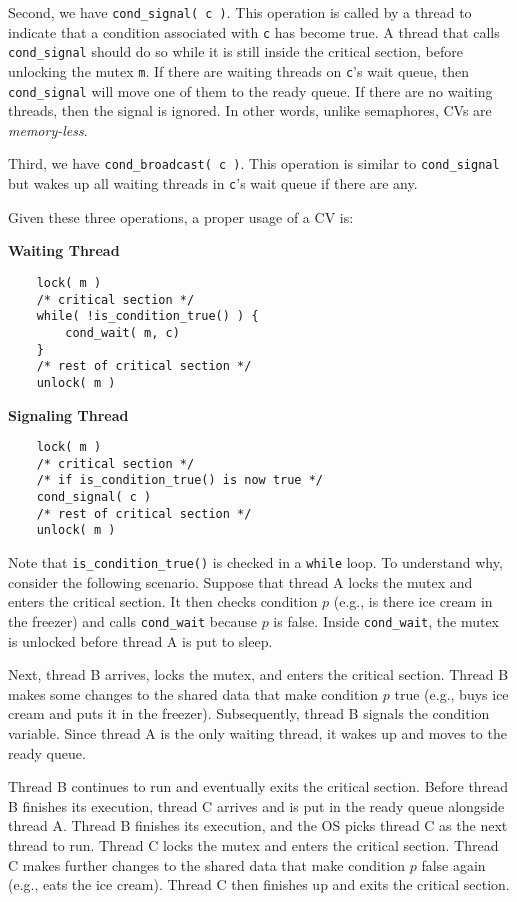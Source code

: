Second, we have \texttt{cond\_signal( c )}.
This operation is called by a thread to indicate that a condition associated with \texttt{c} has become true.
A thread that calls \texttt{cond\_signal} should do so while it is still inside the critical section, before unlocking the mutex \texttt{m}.
If there are waiting threads on \texttt{c}'s wait queue, then \texttt{cond\_signal} will move one of them to the ready queue.
If there are no waiting threads, then the signal is ignored.
In other words, unlike semaphores, CVs are \emph{memory-less}.

Third, we have \texttt{cond\_broadcast( c )}.
This operation is similar to \texttt{cond\_signal} but wakes up all waiting threads in \texttt{c}'s wait queue if there are any.

Given these three operations, a proper usage of a CV is:

\begin{multicols}{2}
	\textbf{Waiting Thread}\vspace{-2em}
	\begin{verbatim}
	lock( m )
	/* critical section */
	while( !is_condition_true() ) {
	    cond_wait( m, c)
	}
	/* rest of critical section */
	unlock( m )
	\end{verbatim}
	\columnbreak
	\textbf{Signaling Thread}
	\begin{verbatim}
	lock( m )
	/* critical section */
	/* if is_condition_true() is now true */
	cond_signal( c )
	/* rest of critical section */
	unlock( m )
  \end{verbatim}
\end{multicols}

Note that \texttt{is\_condition\_true()} is checked in a \texttt{while} loop.
To understand why, consider the following scenario.
Suppose that thread A locks the mutex and enters the critical section.
It then checks condition $p$ (e.g., is there ice cream in the freezer) and calls \texttt{cond\_wait} because $p$ is false.
Inside \texttt{cond\_wait}, the mutex is unlocked before thread A is put to sleep.

Next, thread B arrives, locks the mutex, and enters the critical section.
Thread B makes some changes to the shared data that make condition $p$ true (e.g., buys ice cream and puts it in the freezer).
Subsequently, thread B signals the condition variable.
Since thread A is the only waiting thread, it wakes up and moves to the ready queue.

Thread B continues to run and eventually exits the critical section.
Before thread B finishes its execution, thread C arrives and is put in the ready queue alongside thread A.
Thread B finishes its execution, and the OS picks thread C as the next thread to run.
Thread C locks the mutex and enters the critical section.
Thread C makes further changes to the shared data that make condition $p$ false again (e.g., eats the ice cream).
Thread C then finishes up and exits the critical section.


